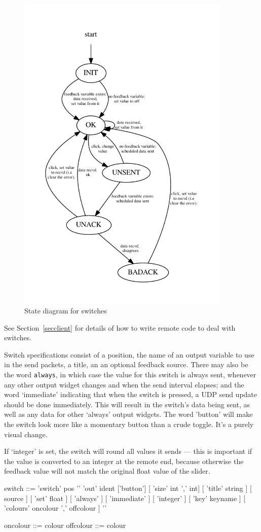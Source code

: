 \begin{figure}[ht]
\center
\includegraphics[width=4in]{stateSwitch.pdf}
\caption{State diagram for switches}
\label{switchstates}
\end{figure}
See Section~\ref{secclient} for details of how to write remote code to deal with switches.

Switch specifications consist of a position, the name of an
output variable to use in the send packets, a title,
an an optional feedback source. There may also be the word \verb+always+, in which case the value for this switch
is always sent, whenever any other output widget changes and when the send interval elapses; and the word `immediate'
indicating that when the switch is pressed, a UDP send update should be done immediately. This will result in the
switch's data being sent, as well as any data for other `always' output widgets. The word 'button' will make the switch
look more like a momentary button than a crude toggle. It's a purely visual change.

If `integer' is set, the switch will round all values it sends --- this is important if the value is converted to an integer
at the remote end, because otherwise the feedback value will not match the original float value of the slider.
\begin{v}
switch      ::= 'switch' pos '{'
                    'out' ident
                    ['button']
                    [ 'size' int ',' int]
                    [ 'title' string ]
                    [ source ]
                    [ 'set' float ]
                    [ 'always' ]
                    [ 'immediate' ]
                    [ 'integer' ]
                    [ 'key' keyname ]
                    [ 'colours' oncolour ',' offcolour ]
                '}'

oncolour    ::= colour
offcolour   ::= colour
\end{v}

